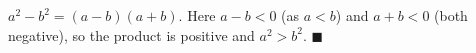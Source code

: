 $a^2-b^2=(a-b)(a+b)$. Here $a-b<0$ (as $a<b$) and $a+b<0$ (both negative), so the product is positive and $a^2>b^2$. $\blacksquare$
